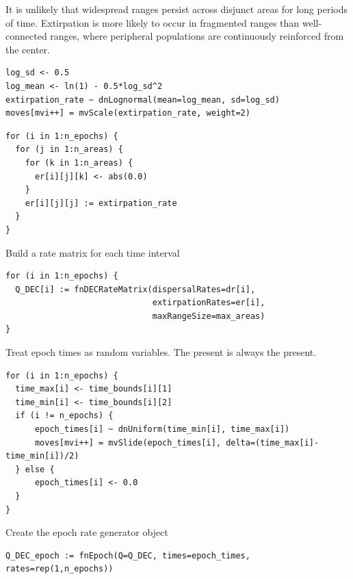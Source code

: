 It is unlikely that widespread ranges persist across disjunct areas for long periods of time.
Extirpation is more likely to occur in fragmented ranges than well-connected ranges, where peripheral populations are continuously reinforced from the center.

\begin{snugshade}
\begin{lstlisting}
log_sd <- 0.5
log_mean <- ln(1) - 0.5*log_sd^2
extirpation_rate ~ dnLognormal(mean=log_mean, sd=log_sd)
moves[mvi++] = mvScale(extirpation_rate, weight=2)
\end{lstlisting}
\end{snugshade}

\begin{snugshade}
\begin{lstlisting}
for (i in 1:n_epochs) {
  for (j in 1:n_areas) {
    for (k in 1:n_areas) {
      er[i][j][k] <- abs(0.0) 
    }
    er[i][j][j] := extirpation_rate
  }
}
\end{lstlisting}
\end{snugshade}



Build a rate matrix for each time interval
\begin{snugshade}
\begin{lstlisting}
for (i in 1:n_epochs) {
  Q_DEC[i] := fnDECRateMatrix(dispersalRates=dr[i],
                              extirpationRates=er[i],
                              maxRangeSize=max_areas)
}
\end{lstlisting}
\end{snugshade}


Treat epoch times as random variables. The present is always the present.
\begin{snugshade}
\begin{lstlisting}
for (i in 1:n_epochs) {
  time_max[i] <- time_bounds[i][1]
  time_min[i] <- time_bounds[i][2]
  if (i != n_epochs) {
      epoch_times[i] ~ dnUniform(time_min[i], time_max[i])
      moves[mvi++] = mvSlide(epoch_times[i], delta=(time_max[i]-time_min[i])/2)
  } else {
      epoch_times[i] <- 0.0
  }
}
\end{lstlisting}
\end{snugshade}


Create the epoch rate generator object
\begin{snugshade}
\begin{lstlisting}
Q_DEC_epoch := fnEpoch(Q=Q_DEC, times=epoch_times, rates=rep(1,n_epochs))
\end{lstlisting}
\end{snugshade}

